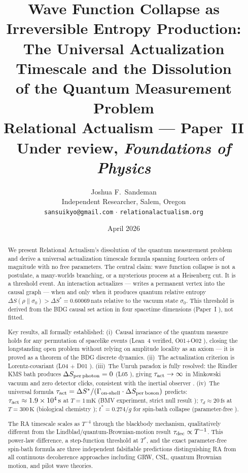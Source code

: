 \documentclass[12pt,a4paper]{article}
\title{\textbf{Wave Function Collapse as Irreversible Entropy Production:\\
The Universal Actualization Timescale and the Dissolution\\of the Quantum Measurement Problem}\\[0.6em]
\large\normalfont Relational Actualism --- Paper~II\\
\normalsize Under review, \textit{Foundations of Physics}}
\author{Joshua F.~Sandeman\\[0.4em]
\small Independent Researcher, Salem, Oregon\\
\small \texttt{sansuikyo@gmail.com} $\cdot$ \texttt{relationalactualism.org}}
\date{April 2026}
\begin{document}
\maketitle

\begin{abstract}
We present Relational Actualism's dissolution of the quantum measurement problem and derive a universal actualization timescale formula spanning fourteen orders of magnitude with no free parameters.  The central claim: wave function collapse is not a postulate, a many-worlds branching, or a mysterious process at a Heisenberg cut.  It is a threshold event.  An interaction actualizes --- writes a permanent vertex into the causal graph --- when and only when it produces quantum relative entropy $\Delta S(\rho\|\sigma_0)>\Delta S^*=0.60069\,\mathrm{nats}$ relative to the vacuum state $\sigma_0$.  This threshold is derived from the BDG causal set action in four spacetime dimensions (Paper~I \cite{RA_P1}), not fitted.

Key results, all formally established:
(i)~Causal invariance of the quantum measure holds for any permutation of spacelike events (Lean~4 verified, O01+O02 \statusLV), closing the longstanding open problem without relying on amplitude locality as an axiom --- it is proved as a theorem of the BDG discrete dynamics.
(ii)~The actualization criterion is Lorentz-covariant (L04 \statusLV + D01 \statusDR).
(iii)~The Unruh paradox is fully resolved: the Rindler KMS bath produces $\Delta S_{\rm per\,photon}=0$ (L05 \statusLV), giving $\tau_{\rm act}\to\infty$ in Minkowski vacuum and zero detector clicks, consistent with the inertial observer \statusDR.
(iv)~The universal formula $\tau_{\rm act}=\Delta S^*/(\Gamma_{\rm on\text{-}shell}\cdot\Delta S_{\rm per\,boson})$ predicts: $\tau_{\rm act}\approx1.9\times10^4\,\mathrm{s}$ at $T=1\,\mathrm{mK}$ (BMV experiment, strict null result \statusDR); $\tau_d\approx20\,\mathrm{fs}$ at $T=300\,\mathrm{K}$ (biological chemistry \statusDR); $t^*=0.274/g$ for spin-bath collapse (parameter-free \statusCV).

The RA timescale scales as $T^{-4}$ through the blackbody mechanism, qualitatively different from the Lindblad/quantum-Brownian-motion result $\tau_{\rm dec}\propto T^{-1}$.  This power-law difference, a step-function threshold at $T^*$, and the exact parameter-free spin-bath formula are three independent falsifiable predictions distinguishing RA from all continuous decoherence approaches including GRW, CSL, quantum Brownian motion, and pilot wave theories.
\end{abstract}
\end{document}

